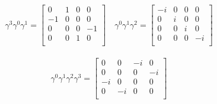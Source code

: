 \documentclass{article}
\begin{document}
\begin{align*}
\gamma^3 \gamma^0 \gamma^1 = \begin{bmatrix}
 0  &  1  &  0  &  0  \\
 -1  &  0  &  0  &  0  \\
 0  &  0  &  0  &  -1  \\
 0  &  0  &  1  &  0  \\
\end{bmatrix} \quad
\gamma^0 \gamma^1 \gamma^2 = \begin{bmatrix}
 -i  &  0  &  0  &  0  \\
 0  &  i  &  0  &  0  \\
 0  &  0  &  i  &  0  \\
 0  &  0  &  0  &  -i  \\
\end{bmatrix}
\end{align*}

\begin{align*}
\gamma^0 \gamma^1 \gamma^2 \gamma^3 = \begin{bmatrix}
 0  &  0  &  -i  &  0  \\
 0  &  0  &  0  &  -i  \\
 -i  &  0  &  0  &  0  \\
 0  &  -i  &  0  &  0  \\
\end{bmatrix}
\end{align*}



%
%
\end{document}
